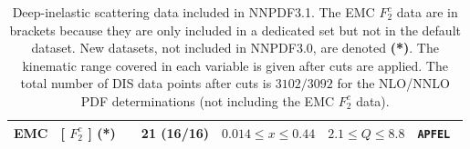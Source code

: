 \begin{table}
\begin{centering}
\begin{tabular}{|c|c|c|c|c|c|c|}
 \tabularnewline
 \hline
 EMC
 &   [ $F_2^c$ ] {\bf (*)}  & \cite{Aubert:1982tt} & 21 (16/16) &$0.014\le x \le 0.44$  & $2.1 \le Q \le 8.8 $ & \tt APFEL
 \tabularnewline
  \hline
\end{tabular}
\par\end{centering}
\caption{\small Deep-inelastic scattering
data included in  NNPDF3.1. The EMC $F_2^c$ data are in brackets because
they are only included in a dedicated set but not in the default dataset.
New datasets, not included in NNPDF3.0, are
denoted {\bf (*)}. 
The kinematic range covered in each variable is given after cuts are applied. 
The total number of DIS data points after cuts is 
$3102/3092$ for the NLO/NNLO PDF determinations (not including the EMC $F_2^c$ data).
\label{tab:completedataset}
}
\end{table}

